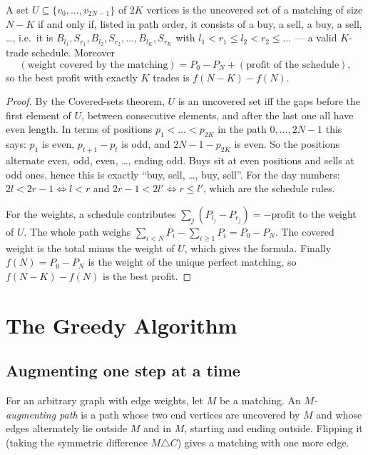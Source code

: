 \documentclass[11pt]{article}
\begin{document}
\begin{theorembox}[Trades $=$ matchings of size $N-K$]
A set $U\subseteq\{v_0,\dots,v_{2N-1}\}$ of $2K$ vertices is the uncovered
set of a matching of size $N-K$ if and only if, listed in path order,
it consists of a buy, a sell, a buy, a sell, \dots, i.e.\ it is
$B_{l_1},S_{r_1},B_{l_2},S_{r_2},\dots,B_{l_K},S_{r_K}$ with
$l_1<r_1\le l_2<r_2\le\dots$ --- a valid $K$-trade schedule. Moreover
\[
  (\text{weight covered by the matching})=P_0-P_N+(\text{profit of the schedule}),
\]
so the best profit with exactly $K$ trades is $f(N-K)-f(N)$.
\end{theorembox}
\begin{proof}
By the Covered-sets theorem, $U$ is an uncovered set iff the gaps before the
first element of $U$, between consecutive elements, and after the last one
all have even length. In terms of positions $p_1<\dots<p_{2K}$ in the
path $0,\dots,2N-1$ this says: $p_1$ is even, $p_{t+1}-p_t$ is odd, and
$2N-1-p_{2K}$ is even. So the positions alternate even, odd, even,
\dots, ending odd. Buys sit at even positions and sells at odd ones, hence
this is exactly ``buy, sell, \dots, buy, sell''. For the day numbers:
$2l<2r-1\iff l<r$ and $2r-1<2l'\iff r\le l'$, which are the schedule
rules.

For the weights, a schedule contributes $\sum_j(P_{l_j}-P_{r_j})=-\text{profit}$
to the weight of $U$. The whole path weighs $\sum_{i<N}P_i-\sum_{i\ge1}P_i=P_0-P_N$.
The covered weight is the total minus the weight of $U$, which gives the
formula. Finally $f(N)=P_0-P_N$ is the weight of the unique perfect
matching, so $f(N-K)-f(N)$ is the best profit.
\end{proof}

\section{The Greedy Algorithm}\label{sec:greedy}
\subsection{Augmenting one step at a time}
For an arbitrary graph with edge weights, let $M$ be a matching. An
\emph{$M$-augmenting path} is a path whose two end vertices are uncovered
by $M$ and whose edges alternately lie outside $M$ and in $M$, starting
and ending outside. Flipping it (taking the symmetric difference
$M\triangle C$) gives a matching with one more edge.
\end{document}
